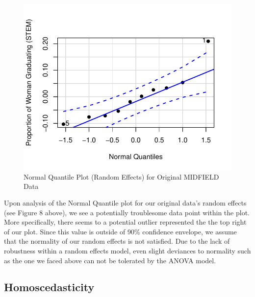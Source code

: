 \documentclass[]{article}
\begin{document}
\begin{figure}
\centering
\includegraphics{Stat_461_Final_Project_Report_files/figure-latex/normalityRE-1.pdf}
\caption{Normal Quantile Plot (Random Effects) for Original MIDFIELD
Data}
\end{figure}

Upon analysis of the Normal Quantile plot for our original data's random
effects (see Figure 8 above), we see a potentially troublesome data
point within the plot. More specifically, there seems to a potential
outlier represented the the top right of our plot. Since this value is
outside of 90\% confidence envelope, we assume that the normality of our
random effects is not satisfied. Due to the lack of robustness within a
random effects model, even slight deviances to normality such as the one
we faced above can not be tolerated by the ANOVA model.

\subsection{Homoscedasticity}\label{homoscedasticity}
\end{document}

